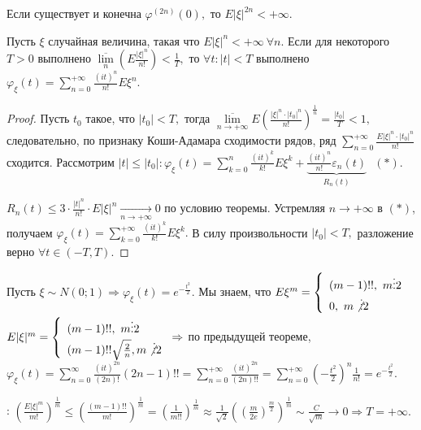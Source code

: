 	\begin{property}[б/д]
		Если существует и конечна \(\varphi^{(2n)}(0),\) то \(E|\xi|^{2n} < +\infty.\)
	\end{property}
	\begin{theorem}
		Пусть \(\xi\) случайная величина, такая что \(E|\xi|^n < +\infty~ \forall n.\) Если для некоторого \(T > 0\) выполнено \(\overline{\lim\limits_{n}}\left(E \frac{|\xi|^n}{n!}\right) < \frac{1}{T},\) то \(\forall t: |t| < T\) выполнено \(\varphi_\xi(t) = \sum\limits_{n = 0}^{+\infty} \frac{(it)^n}{n!}E\xi^n.\)
		\begin{proof}
			Пусть \(t_0\) такое, что \(|t_0| < T, \) тогда \(\overline{\lim\limits_{n \to +\infty}}E\left(\frac{|\xi|^n \cdot |t_0|^n}{n!}\right)^{\frac{1}{n}} = \frac{|t_0|}{T} < 1, \) следовательно, по признаку Коши-Адамара сходимости рядов, ряд \(\sum\limits_{n = 0}^{+\infty} \frac{E|\xi|^n\cdot|t_0|^n}{n!}\) сходится.
			Рассмотрим \(|t| \leqslant |t_0|: \varphi_\xi(t) = \sum\limits_{k = 0}^{n} \frac{(it)^k}{k!}E\xi^k + \underbrace{\frac{(it)^n}{n!}\varepsilon_n(t)}_{R_n(t)}~~~(*).\) 

			\noindent\(R_n(t) \leqslant 3\cdot \frac{|t|^n}{n!}\cdot E|\xi|^n \underset{n \to +\infty}{\longrightarrow} 0\) по условию теоремы. Устремляя \(n\to + \infty\) в \((*)\), получаем \(\varphi_\xi(t) = \sum\limits_{k = 0}^{+\infty} \frac{(it)^k}{k!}E\xi^k.\) В силу произвольности \(|t_0| < T,\) разложение верно \(\forall t \in (-T, T).\)
		\end{proof}
	\end{theorem}

	\begin{example}
		Пусть \(\xi \sim N(0;1) \Rightarrow \varphi_\xi(t) = e^{- \frac{t^2}{2}}.\) Мы знаем, что \(E\xi^m = \left\{
			\begin{array}{l}
			(m-1)!!, ~m \vdots 2\\
			0, ~m\not \vdots 2
			\end{array}
		\right.\)
		\(E|\xi|^m = \left\{
			\begin{array}{l}
			(m - 1)!!, ~m \vdots 2\\
			(m - 1)!!\sqrt{\frac{2}{n}}, m \not \vdots 2
			\end{array}
		\right. \Rightarrow\) по предыдущей теореме, 
		\(\varphi_\xi(t) = \sum\limits_{n = 0}^{\infty} \frac{(it)^{2n}}{(2n)!}(2n - 1)!! = \sum\limits_{n = 0}^{+\infty} \frac{(it)^{2n}}{(2n)!!} = \sum\limits_{n = 0}^{+\infty} \left(- \frac{t^2}{2}\right)^n \frac{1}{n!} = e^{-\frac{t^2}{2}}.\)

		\underline{}: \(\left(\frac{E|\xi|^m}{m!}\right)^{\frac{1}{m}} \leqslant \left(\frac{(m - 1)!!}{m!}\right)^{\frac{1}{m}} = \left(\frac{1}{m!!}\right)^{\frac{1}{m}} \approx \frac{1}{\sqrt{2}}\left(\left(\frac{m}{2e}\right)^{\frac{m}{2}}\right)^{\frac{1}{m}} \sim \frac{C}{\sqrt{m}} \to 0 \Rightarrow T = + \infty.\)
	\end{example}

